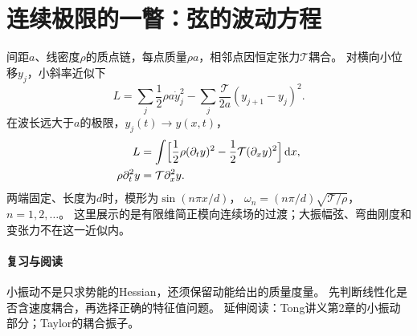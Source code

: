 \section{连续极限的一瞥：弦的波动方程}
间距$a$、线密度$\rho$的质点链，每点质量$\rho a$，相邻点因恒定张力$\mathcal T$耦合。
对横向小位移$y_j$，小斜率近似下
\begin{equation}
 L = \sum_j\frac12\rho a\dot y_j^2
 - \sum_j\frac{\mathcal T}{2a}(y_{j+1} - y_j)^2.
\end{equation}
在波长远大于$a$的极限，$y_j(t) \to y(x,t)$，
\begin{subequations}
 \begin{align}
  L &= \int\Bigl[\frac12\rho(\partial_ty)^2 - \frac12\mathcal T(\partial_xy)^2\Bigr]\mathop{}\!\mathrm{d} x,\\
  \rho\partial_t^2y &= \mathcal T\partial_x^2y.
 \end{align}
\end{subequations}
两端固定、长度为$d$时，模形为$\sin(n\pi x/d)$，
$\omega_n = (n\pi/d)\sqrt{\mathcal T/\rho}$，$n = 1,2,\ldots$。
这里展示的是有限维简正模向连续场的过渡；大振幅弦、弯曲刚度和变张力不在这一近似内。

\paragraph{复习与阅读}
小振动不是只求势能的Hessian，还须保留动能给出的质量度量。
先判断线性化是否含速度耦合，再选择正确的特征值问题。
延伸阅读：Tong讲义第2章的小振动部分；Taylor的耦合振子。
